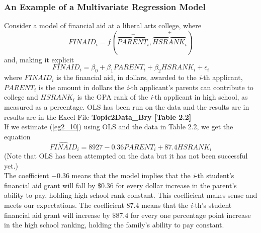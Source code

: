 \documentclass[11pt]{article}
\begin{document}
\subsubsection{An Example of a Multivariate Regression Model}
Consider a model of financial aid at a liberal arts college, where
\begin{equation}
FINAID_i = f(\overbrace{PARENT_i}^-, \overbrace{HSRANK_i}^+) \label{eg2_9}
\end{equation}
and, making it explicit
\begin{equation}
FINAID_i = \beta_0 + \beta_1PARENT_i + \beta_2HSRANK_i+ \epsilon_i \label{eg2_10}
\end{equation}
where $FINAID_i$ is the financial aid, in dollars, awarded to the \textit{i}-th applicant, $PARENT_i$ is the amount in dollars the \textit{i}-th applicant's parents can contribute to college and $HSRANK_i$ is the GPA rank of the \textit{i}-th applicant in high school, as measured as a percentage. OLS has been run on the data and the results are in results are in the Excel File \textbf{Topic2Data\_Bry [Table 2.2]}\\
If we estimate (\ref{eg2_10}) using OLS and the data in Table 2.2, we get the equation
\begin{equation}
\widehat{FINAID}_i = 8927-0.36PARENT_i + 87.4HSRANK_i \label{eg2_11}
\end{equation}
(Note that OLS has been attempted on the data but it has not been successful yet.)\\
The coefficient $-0.36$ means that the model implies that the \textit{i}-th student's financial aid grant will fall by $\$0.36$ for every dollar increase in the parent's ability to pay, holding high school rank constant. This coefficient makes sense and meets our expectations. The coefficient $87.4$ means that the \textit{i}-th's student financial aid grant will increase by $\$87.4$ for every one percentage point increase in the high school ranking, holding the family's ability to pay constant.
\end{document}
